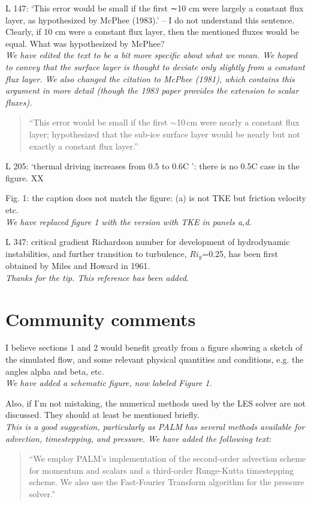 \documentclass[tc, manuscript]{copernicus}
\begin{document}
L 147: ‘This error would be small if the first ∼10 cm were largely a constant flux layer, as hypothesized by McPhee (1983).’ – I do not understand this sentence. Clearly, if 10 cm were a constant flux layer, then the mentioned fluxes would be equal. What was hypothesized by McPhee?\\
\textit{We have edited the text to be a bit more specific about what we mean. We hoped to convey that the surface layer is thought to deviate only slightly from a constant flux layer. We also changed the citation to McPhee (1981), which contains this argument in more detail (though the 1983 paper provides the extension to scalar fluxes).}
\begin{quote}
``This error would be small if the first $\sim$10\,\unit{cm} were nearly a constant flux layer; \citet{mcphee_analytic_1981} hypothesized that the sub-ice surface layer would be nearly but not exactly a constant flux layer.''
\end{quote}\vspace{12pt}

L 205: ‘thermal driving increases from 0.5 to 0.6C ’: there is no 0.5C case in the figure.
XX\vspace{12pt}

Fig. 1: the caption does not match the figure: (a) is not TKE but friction velocity etc.\\
\textit{We have replaced figure 1 with the version with TKE in panels a,d.}\vspace{12pt}

L 347: critical gradient Richardson number for development of hydrodynamic instabilities, and further transition to turbulence, $Ri_g$=0.25, has been first obtained by Miles and Howard in 1961.\\
\textit{Thanks for the tip. This reference has been added.}\vspace{12pt}

\section{Community comments}
I believe sections 1 and 2 would benefit greatly from a figure showing a sketch of the simulated flow, and some relevant physical quantities and conditions, e.g. the angles alpha and beta, etc.\\
\textit{We have added a schematic figure, now labeled Figure 1.}\vspace{12pt}

Also, if I'm not mistaking, the numerical methods used by the LES solver are not discussed. They should at least be mentioned briefly.\\
\textit{This is a good suggestion, particularly as PALM has several methods available for advection, timestepping, and pressure. We have added the following text:}
\begin{quote}
``We employ PALM's implementation of the \citet{piacsek_conservation_1970} second-order advection scheme for momentum and scalars and a third-order Runge-Kutta timestepping scheme. We also use the \citet{temperton_generalized_1992} Fast-Fourier Transform algorithm for the pressure solver.''
\end{quote}\vspace{12pt}
\end{document}
